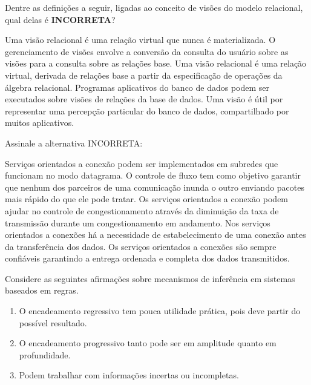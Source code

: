 \documentclass[12pt, addpoints]{exam}
\begin{document}
\begin{questions}
\question

Dentre as definições a seguir, ligadas ao conceito de visões do modelo relacional, qual delas é \textbf{INCORRETA}?


\begin{choices}
\choice Uma visão relacional é uma relação virtual que nunca é materializada.
\choice O gerenciamento de visões envolve a conversão da consulta do usuário sobre as visões para a consulta sobre as relações base.
\choice Uma visão relacional é uma relação virtual, derivada de relações base a partir da especificação de operações da álgebra relacional.
\choice Programas aplicativos do banco de dados podem ser executados sobre visões de relações da base de dados.
\choice Uma visão é útil por representar uma percepção particular do banco de dados, compartilhado por muitos aplicativos.
\end{choices}

\question

Assinale a alternativa INCORRETA:


\begin{choices}
\choice Serviços orientados a conexão podem ser implementados em subredes que funcionam no modo datagrama.
\choice O controle de fluxo tem como objetivo garantir que nenhum dos parceiros de uma comunicação inunda o outro enviando pacotes mais rápido do que ele pode tratar.
\choice Os serviços orientados a conexão podem ajudar no controle de congestionamento através da diminuição da taxa de transmissão durante um congestionamento em andamento.
\choice Nos serviços orientados a conexões há a necessidade de estabelecimento de uma conexão antes da transferência dos dados.
\choice Os serviços orientados a conexões são sempre confiáveis garantindo a entrega ordenada e completa dos dados transmitidos.
\end{choices}

\question

Considere as seguintes afirmações sobre mecanismos de inferência em sistemas baseados em regras.

\begin{enumerate}[label=\Roman*.]

    \item O encadeamento regressivo tem pouca utilidade prática, pois deve partir do possível resultado.

    \item O encadeamento progressivo tanto pode ser em amplitude quanto em profundidade.

    \item Podem trabalhar com informações incertas ou incompletas. 


\end{enumerate}
\end{questions}
\end{document}
